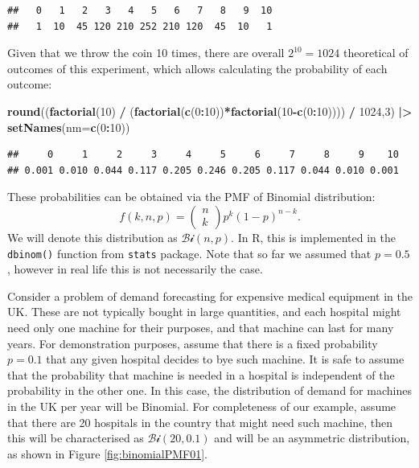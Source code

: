 \documentclass[
]{book}
\newenvironment{Shaded}{\begin{snugshade}}{\end{snugshade}}
\newcommand{\AttributeTok}[1]{\textcolor[rgb]{0.13,0.29,0.53}{#1}}
\newcommand{\DecValTok}[1]{\textcolor[rgb]{0.00,0.00,0.81}{#1}}
\newcommand{\FunctionTok}[1]{\textcolor[rgb]{0.13,0.29,0.53}{\textbf{#1}}}
\newcommand{\NormalTok}[1]{#1}
\newcommand{\SpecialCharTok}[1]{\textcolor[rgb]{0.81,0.36,0.00}{\textbf{#1}}}
\theoremstyle{definition}
\theoremstyle{definition}
\theoremstyle{definition}
\theoremstyle{definition}
\theoremstyle{remark}
\begin{document}
\begin{verbatim}
##   0   1   2   3   4   5   6   7   8   9  10 
##   1  10  45 120 210 252 210 120  45  10   1
\end{verbatim}

Given that we throw the coin 10 times, there are overall \(2^{10}=1024\) theoretical of outcomes of this experiment, which allows calculating the probability of each outcome:

\begin{Shaded}
\begin{Highlighting}[]
\FunctionTok{round}\NormalTok{((}\FunctionTok{factorial}\NormalTok{(}\DecValTok{10}\NormalTok{) }\SpecialCharTok{/}
\NormalTok{           (}\FunctionTok{factorial}\NormalTok{(}\FunctionTok{c}\NormalTok{(}\DecValTok{0}\SpecialCharTok{:}\DecValTok{10}\NormalTok{))}\SpecialCharTok{*}\FunctionTok{factorial}\NormalTok{(}\DecValTok{10}\SpecialCharTok{{-}}\FunctionTok{c}\NormalTok{(}\DecValTok{0}\SpecialCharTok{:}\DecValTok{10}\NormalTok{)))) }\SpecialCharTok{/}
          \DecValTok{1024}\NormalTok{,}\DecValTok{3}\NormalTok{) }\SpecialCharTok{|\textgreater{}}
    \FunctionTok{setNames}\NormalTok{(}\AttributeTok{nm=}\FunctionTok{c}\NormalTok{(}\DecValTok{0}\SpecialCharTok{:}\DecValTok{10}\NormalTok{))}
\end{Highlighting}
\end{Shaded}

\begin{verbatim}
##     0     1     2     3     4     5     6     7     8     9    10 
## 0.001 0.010 0.044 0.117 0.205 0.246 0.205 0.117 0.044 0.010 0.001
\end{verbatim}

These probabilities can be obtained via the PMF of Binomial distribution:
\begin{equation}
    f(k, n, p) = \begin{pmatrix} n \\ k \end{pmatrix} p^k (1-p)^{n-k} .
    \label{eq:BinomialPMF}
\end{equation}
We will denote this distribution as \(\mathcal{Bi}(n, p)\). In R, this is implemented in the \texttt{dbinom()} function from \texttt{stats} package. Note that so far we assumed that \(p=0.5\), however in real life this is not necessarily the case.

Consider a problem of demand forecasting for expensive medical equipment in the UK. These are not typically bought in large quantities, and each hospital might need only one machine for their purposes, and that machine can last for many years. For demonstration purposes, assume that there is a fixed probability \(p=0.1\) that any given hospital decides to bye such machine. It is safe to assume that the probability that machine is needed in a hospital is independent of the probability in the other one. In this case, the distribution of demand for machines in the UK per year will be Binomial. For completeness of our example, assume that there are 20 hospitals in the country that might need such machine, then this will be characterised as \(\mathcal{Bi}(20, 0.1)\) and will be an asymmetric distribution, as shown in Figure \ref{fig:binomialPMF01}.
\end{document}
